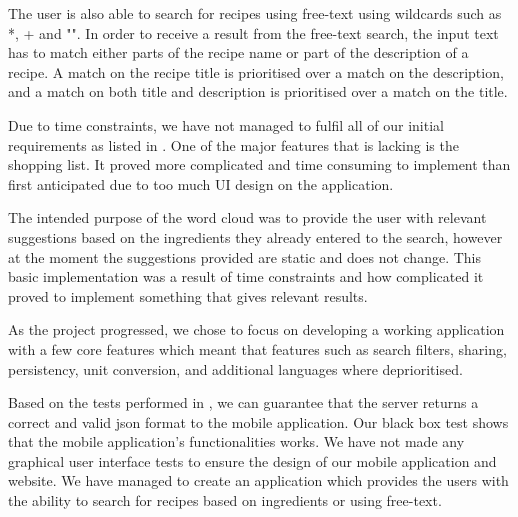 The user is also able to search for recipes using free-text using wildcards such as *, + and "". In order to receive a result from the free-text search, the input text has to match either parts of the recipe name or part of the description of a recipe. A match on the recipe title is prioritised over a match on the description, and a match on both title and description is prioritised over a match on the title.

Due to time constraints, we have not managed to fulfil all of our initial requirements as listed in . One of the major features that is lacking is the shopping list. It proved more complicated and time consuming to implement than first anticipated due to too much UI design on the application.

The intended purpose of the word cloud was to provide the user with relevant suggestions based on the ingredients they already entered to the search, however at the moment the suggestions provided are static and does not change. This basic implementation was a result of time constraints and how complicated it proved to implement something that gives relevant results. 

As the project progressed, we chose to focus on developing a working application with a few core features which meant that features such as search filters, sharing, persistency, unit conversion, and additional languages where deprioritised. 

Based on the tests performed in , we can guarantee that the server returns a correct and valid \ac{json} format to the mobile application. Our black box test shows that the mobile application's functionalities works. We have not made any graphical user interface tests to ensure the design of our mobile application and website. We have managed to create an application which provides the users with the ability to search for recipes based on ingredients or using free-text.